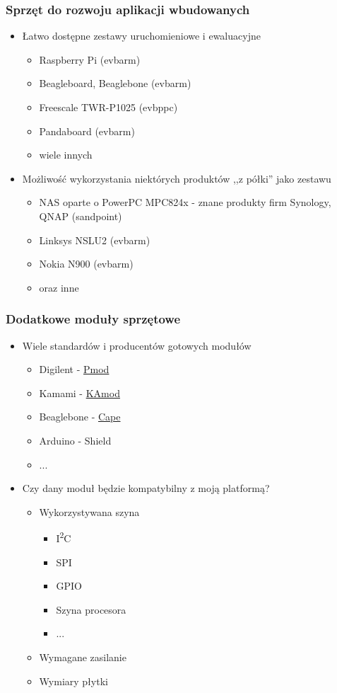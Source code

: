 \documentclass[dvipsnames,table]{beamer}
\begin{document}
\begin{frame}
\frametitle{Sprzęt do rozwoju aplikacji wbudowanych}
\begin{itemize}
	\item Łatwo dostępne zestawy uruchomieniowe i ewaluacyjne
	\begin{itemize}
		\item Raspberry Pi (evbarm)
		\item Beagleboard, Beaglebone (evbarm)
		\item Freescale TWR-P1025 (evbppc)
		\item Pandaboard (evbarm)
		\item wiele innych
	\end{itemize}
	\item Możliwość wykorzystania niektórych produktów ,,z półki'' jako zestawu
	\begin{itemize}
		\item NAS oparte o PowerPC MPC824x - znane produkty firm Synology, QNAP (sandpoint)
		\item Linksys NSLU2 (evbarm)
		\item Nokia N900 (evbarm)
		\item oraz inne
	\end{itemize}
\end{itemize}
\end{frame}

\begin{frame}
\frametitle{Dodatkowe moduły sprzętowe}
\begin{itemize}
	\item Wiele standardów i producentów gotowych modułów
		\begin{itemize}
			\item Digilent - \href{http://www.digilentinc.com/Products/Catalog.cfm?NavPath=2,401&Cat=9}{Pmod}
			\item Kamami - \href{http://kamami.pl/index.php?categoryID=3308}{KAmod}
			\item Beaglebone - \href{http://circuitco.com/support/index.php?title=BeagleBone_Capes}{Cape}
			\item Arduino - Shield
			\item ...
		\end{itemize}
	\item Czy dany moduł będzie kompatybilny z moją platformą?
	\begin{itemize}
		\item Wykorzystywana szyna
			\begin{itemize}
				\item I\textsuperscript{2}C
				\item SPI 
				\item GPIO
				\item Szyna procesora
				\item ...
			\end{itemize}
		\item Wymagane zasilanie
		\item Wymiary płytki
	\end{itemize}
\end{itemize}
\end{frame}
\end{document}
